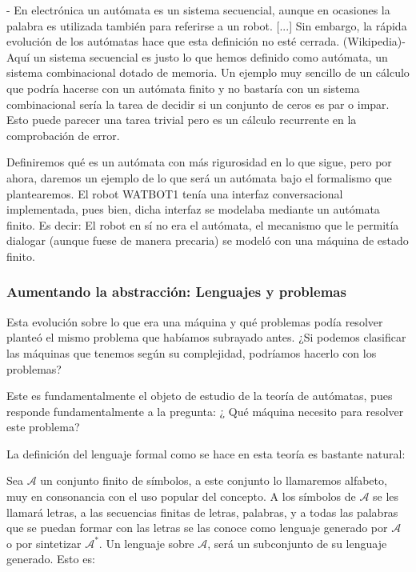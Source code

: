 - En electrónica un autómata es un sistema secuencial, aunque en ocasiones la palabra es utilizada también para referirse a un robot. [...] Sin embargo, la rápida evolución de los autómatas hace que esta definición no esté cerrada. (Wikipedia)- \\

Aquí un sistema secuencial es justo lo que hemos definido como autómata, un sistema combinacional dotado de memoria.  Un ejemplo muy sencillo de un cálculo que podría hacerse con un autómata finito y no bastaría con un sistema combinacional sería la tarea de decidir si un conjunto de ceros es par o impar. Esto puede parecer una tarea trivial pero es un cálculo recurrente en la comprobación de error.

\vspace{10px}


Definiremos qué es un autómata con más rigurosidad en lo que sigue, pero por ahora, daremos un ejemplo de lo que será un autómata bajo el formalismo que plantearemos. El robot WATBOT1 tenía una interfaz conversacional implementada, pues bien, dicha interfaz se modelaba mediante un autómata finito. Es decir: El robot en sí no era el autómata, el mecanismo que le permitía dialogar (aunque fuese de manera precaria) se modeló con una máquina de estado finito.

\subsubsection{Aumentando la abstracción: Lenguajes y problemas }


Esta evolución sobre lo que era una máquina y qué problemas podía resolver planteó el mismo problema que habíamos subrayado antes. ¿Si podemos clasificar las máquinas que tenemos según su complejidad, podríamos hacerlo con los problemas?

\vspace{10px}

Este es fundamentalmente el objeto de estudio de la teoría de autómatas, pues responde fundamentalmente a la pregunta: ¿ Qué máquina necesito para resolver este problema?

\vspace{10px}

La definición del lenguaje formal como se hace en esta teoría es bastante natural:

\vspace{10px}


Sea  $\mathcal{A}$ un conjunto finito de símbolos, a este conjunto lo llamaremos alfabeto, muy en consonancia con el uso popular del concepto. A los símbolos de $\mathcal{A}$ se les llamará letras, a las secuencias finitas de letras, palabras, y a todas las palabras que se puedan formar con las letras se las conoce como lenguaje generado por $\mathcal{A}$ o por sintetizar $\mathcal{A}^{*}$. Un lenguaje sobre $\mathcal{A}$, será un subconjunto de su lenguaje generado. Esto es:


